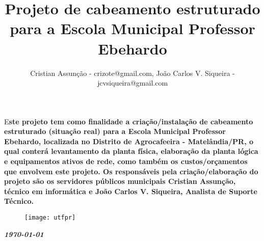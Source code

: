\documentclass[	DIV=calc,%
							paper=a4,%
							fontsize=12pt,%
							onecolumn]{scrartcl}	 					%
\title{Projeto de cabeamento estruturado para a Escola Municipal Professor Ebehardo}					%
\author{Cristian Assunção - crizote@gmail.com, João Carlos V. Siqueira - jcvsiqueira@gmail.com }  	%
\date{}																				%
\newcommand{\initial}[1]{%
     \lettrine[lines=3,lhang=0.3,nindent=0em]{
     				\color{DarkGoldenrod}
     				{\textsf{#1}}}{}}
\begin{document}
\maketitle
\thispagestyle{fancy} 	
\thispagestyle{empty}		%

\initial{E}\textbf{ste projeto tem como finalidade a criação/instalação de cabeamento estruturado (situação real) para a Escola Municipal Professor Ebehardo, localizada no Distrito de Agrocafeeira - Matelândia/PR, o qual conterá levantamento da planta física, elaboração da planta lógica e equipamentos ativos de rede, como também os custos/orçamentos que envolvem este projeto. Os responsáveis pela criação/elaboração do projeto são os servidores públicos municipais Cristian Assunção, técnico em informática e João Carlos V. Siqueira, Analista de Suporte Técnico.}
	

\begin{figure}
	\centering
	\texttt{[image: utfpr]}
\end{figure}

\vspace{3cm}
\centerline{\textit{\textbf{\today}}}

\clearpage
    \renewcommand*\listfigurename{Lista de figuras}
\listoffigures

\renewcommand*\listtablename{Lista de tabelas}
\listoftables
\end{document}
